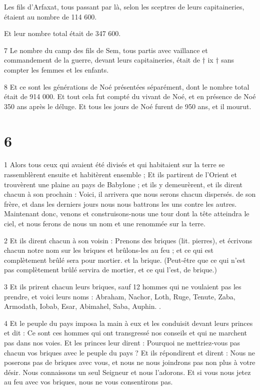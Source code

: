 \par Les fils d'Arfaxat, tous passant par là, selon les sceptres de leurs capitaineries, étaient au nombre de 114 600.

\par Et leur nombre total était de 347 600.

\par 7 Le nombre du camp des fils de Sem, tous partis avec vaillance et commandement de la guerre, devant leurs capitaineries, était de † ix † sans compter les femmes et les enfants.

\par 8 Et ce sont les générations de Noé présentées séparément, dont le nombre total était de 914 000. Et tout cela fut compté du vivant de Noé, et en présence de Noé 350 ans après le déluge. Et tous les jours de Noé furent de 950 ans, et il mourut.

\chapter{6}

\par 1 Alors tous ceux qui avaient été divisés et qui habitaient sur la terre se rassemblèrent ensuite et habitèrent ensemble ; Et ils partirent de l'Orient et trouvèrent une plaine au pays de Babylone ; et ils y demeurèrent, et ils dirent chacun à son prochain : Voici, il arrivera que nous serons chacun dispersés. de son frère, et dans les derniers jours nous nous battrons les uns contre les autres. Maintenant donc, venons et construisons-nous une tour dont la tête atteindra le ciel, et nous ferons de nous un nom et une renommée sur la terre.

\par 2 Et ils dirent chacun à son voisin : Prenons des briques (lit. pierres), et écrivons chacun notre nom sur les briques et brûlons-les au feu ; et ce qui est complètement brûlé sera pour mortier. et la brique. (Peut-être que ce qui n'est pas complètement brûlé servira de mortier, et ce qui l'est, de brique.)

\par 3 Et ils prirent chacun leurs briques, sauf 12 hommes qui ne voulaient pas les prendre, et voici leurs noms : Abraham, Nachor, Loth, Ruge, Tenute, Zaba, Armodath, Iobab, Esar, Abimahel, Saba, Auphin. .

\par 4 Et le peuple du pays imposa la main à eux et les conduisit devant leurs princes et dit : Ce sont ces hommes qui ont transgressé nos conseils et qui ne marchent pas dans nos voies. Et les princes leur dirent : Pourquoi ne mettriez-vous pas chacun vos briques avec le peuple du pays ? Et ils répondirent et dirent : Nous ne poserons pas de briques avec vous, et nous ne nous joindrons pas non plus à votre désir. Nous connaissons un seul Seigneur et nous l’adorons. Et si vous nous jetez au feu avec vos briques, nous ne vous consentirons pas.

